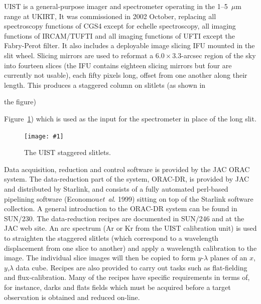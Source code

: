 \documentclass[twoside,11pt]{article}
\newcommand{\htmladdnormallink}[2]{#1}
\newcommand{\htmladdimg}[1]{}
\newcommand{\latex}[1]{#1}
\newcommand{\xref}[3]{#1}
\newcommand{\myfig} [5] {
  \begin{figure}[thb]
    \centering\texttt{[image: \#1]}
    \typeout{#1 inserted on page \arabic{page}}
    \caption{\label{#4}#5}
  \end{figure}
  }
\newcommand{\myfig}[5]{
    \label{#4} \htmladdimg{#3}\\
    Figure: #5\\
    }
\begin{document}
UIST is a general-purpose imager and spectrometer operating in the
1--5~$\mu$m range at
\htmladdnormallink{UKIRT}{http://www.jach.hawaii.edu/UKIRT/}, It was
commissioned in 2002 October, replacing all spectroscopy functions of
CGS4 except for echelle spectroscopy, all imaging functions of
IRCAM/TUFTI and all imaging functions of UFTI except the Fabry-Perot
filter.  It also includes a deployable image slicing IFU mounted in
the slit wheel.  Slicing mirrors are used to reformat a
$6.0\times3.3$-arcsec region of the sky into fourteen slices (the IFU
contains eighteen slicing mirrors but four are currently not usable),
each fifty pixels long, offset from one another along their length.  This
produces a staggered column on slitlets (as shown in
\begin{htmlonly}
the figure)
\end{htmlonly}
\latex{Figure~\ref{sc16_uist_fig})} which is used as the input for the
spectrometer in place of the long slit.

\myfig{sc16_uist.eps}{height=0.6\textheight}{sc16_uist.gif}{sc16_uist_fig}{The UIST staggered slitlets.} 

Data acquisition, reduction and control software is provided by the
\htmladdnormallink{JAC}{http://www.jach.hawaii.edu/} ORAC system.  The
data-reduction part of the system,
\htmladdnormallink{ORAC-DR}{http://www.oracdr.org},
is provided by JAC and distributed by Starlink, and consists of a 
fully automated perl-based \htmladdnormallink{pipelining
software}{http://monet.astro.uiuc.edu/adass98/Proceedings/economouf/}\latex{
(Economou\emph{et~al}. 1999)} sitting on top of the Starlink software
collection.  A general introduction to the ORAC-DR system can be found
in \xref{SUN/230}{sun230}{}.  The data-reduction recipes are 
documented in \xref{SUN/246}{sun246}{} and at the 
\htmladdnormallink{JAC web
site}{http://www.jach.hawaii.edu/UKIRT/instruments/uist/ifu/uistoracdr.html}.
An arc spectrum (Ar or Kr from the UIST calibration unit) is used to
straighten the staggered slitlets (which correspond to a wavelength
displacement from one slice to another) and apply a wavelength
calibration to the image.  The individual slice images will then be
copied to form $y$-$\lambda$ planes of an $x$,$y$,$\lambda$ data cube.
Recipes are also provided to carry out tasks such as flat-fielding and
flux-calibration.  Many of the recipes have specific requirements in
terms of, for instance, darks and flats fields which must be acquired
before a target observation is obtained and reduced on-line.
\end{document}
